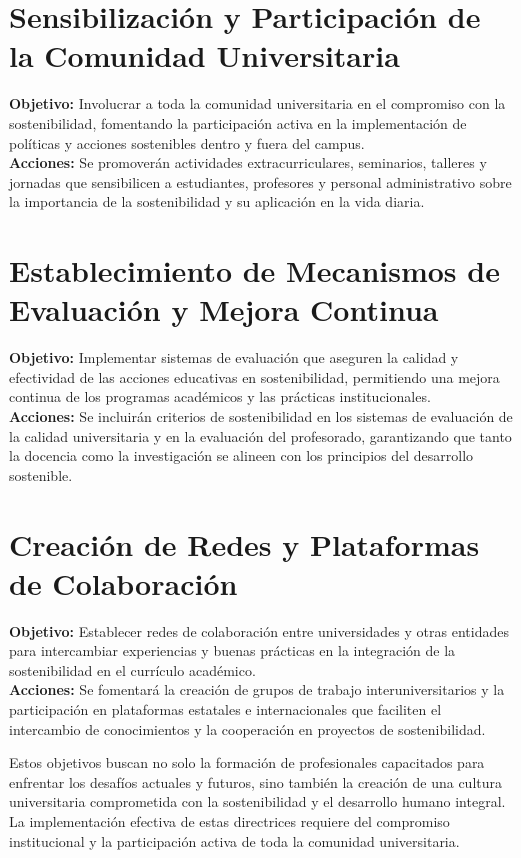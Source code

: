 \section{Sensibilización y Participación de la Comunidad Universitaria}
\textbf{Objetivo:} Involucrar a toda la comunidad universitaria en el compromiso con la sostenibilidad, fomentando la participación activa en la implementación de políticas y acciones sostenibles dentro y fuera del campus.\\
\textbf{Acciones:} Se promoverán actividades extracurriculares, seminarios, talleres y jornadas que sensibilicen a estudiantes, profesores y personal administrativo sobre la importancia de la sostenibilidad y su aplicación en la vida diaria.

\section{Establecimiento de Mecanismos de Evaluación y Mejora Continua}
\textbf{Objetivo:} Implementar sistemas de evaluación que aseguren la calidad y efectividad de las acciones educativas en sostenibilidad, permitiendo una mejora continua de los programas académicos y las prácticas institucionales.\\
\textbf{Acciones:} Se incluirán criterios de sostenibilidad en los sistemas de evaluación de la calidad universitaria y en la evaluación del profesorado, garantizando que tanto la docencia como la investigación se alineen con los principios del desarrollo sostenible.

\section{Creación de Redes y Plataformas de Colaboración}
\textbf{Objetivo:} Establecer redes de colaboración entre universidades y otras entidades para intercambiar experiencias y buenas prácticas en la integración de la sostenibilidad en el currículo académico.\\
\textbf{Acciones:} Se fomentará la creación de grupos de trabajo interuniversitarios y la participación en plataformas estatales e internacionales que faciliten el intercambio de conocimientos y la cooperación en proyectos de sostenibilidad.

Estos objetivos buscan no solo la formación de profesionales capacitados para enfrentar los desafíos actuales y futuros, sino también la creación de una cultura universitaria comprometida con la sostenibilidad y el desarrollo humano integral. La implementación efectiva de estas directrices requiere del compromiso institucional y la participación activa de toda la comunidad universitaria.\cite{crue2020}

